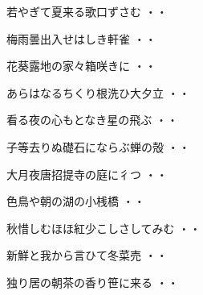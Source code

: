 \vspace{0.4cm}
\begin{shiika}若やぎて夏来る歌口ずさむ
\hfill{・・}\end{shiika}
\vspace{0.4cm}
\begin{shiika}梅雨曇出入せはしき軒雀
\hfill{・・}\end{shiika}
\vspace{0.4cm}
\begin{shiika}花葵露地の家々箱咲きに
\hfill{・・}\end{shiika}
\vspace{0.4cm}
\begin{shiika}あらはなるちくり根洗ひ大夕立
\hfill{・・}\end{shiika}
\vspace{0.4cm}
\begin{shiika}看る夜の心もとなき星の飛ぶ
\hfill{・・}\end{shiika}
\vspace{0.4cm}
\begin{shiika}子等去りぬ礎石にならぶ蝉の殻
\hfill{・・}\end{shiika}
\vspace{0.4cm}
\begin{shiika}大月夜唐招提寺の庭に彳つ
\hfill{・・}\end{shiika}
\vspace{0.4cm}
\begin{shiika}色鳥や朝の湖の小桟橋
\hfill{・・}\end{shiika}
\vspace{0.4cm}
\begin{shiika}秋惜しむほほ紅少こしさしてみむ
\hfill{・・}\end{shiika}
\vspace{0.4cm}
\begin{shiika}新鮮と我から言ひて冬菜売
\hfill{・・}\end{shiika}
\vspace{0.4cm}
\begin{shiika}独り居の朝茶の香り笹に来る
\hfill{・・}\end{shiika}
